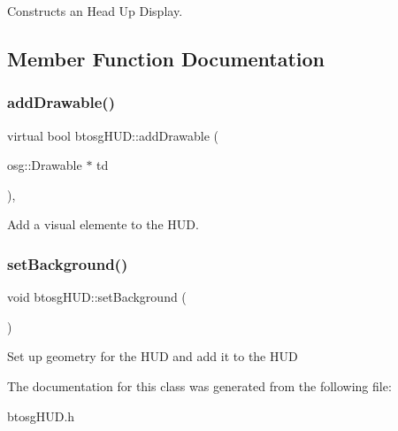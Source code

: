 Constructs an Head Up Display. 

\subsection{Member Function Documentation}
\mbox{\label{classbtosgHUD_a182be3e4bdf00f9ff2b9c482833089a4}} 
\subsubsection{\texorpdfstring{addDrawable()}{addDrawable()}}
{\footnotesize\ttfamily virtual bool btosg\+H\+U\+D\+::add\+Drawable (\begin{DoxyParamCaption}\item[{osg\+::\+Drawable $\ast$}]{td }\end{DoxyParamCaption})\hspace{0.3cm}{\ttfamily [inline]}, {\ttfamily [virtual]}}

Add a visual elemente to the H\+UD. \mbox{\label{classbtosgHUD_a18c1eb80934574e6bdabbbee43e0bfeb}} 
\subsubsection{\texorpdfstring{setBackground()}{setBackground()}}
{\footnotesize\ttfamily void btosg\+H\+U\+D\+::set\+Background (\begin{DoxyParamCaption}{ }\end{DoxyParamCaption})\hspace{0.3cm}{\ttfamily [inline]}}

Set up geometry for the H\+UD and add it to the H\+UD 

The documentation for this class was generated from the following file\+:\begin{DoxyCompactItemize}
\item 
btosg\+H\+U\+D.\+h\end{DoxyCompactItemize}
